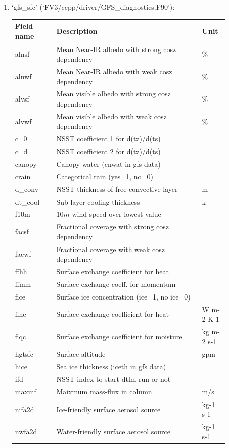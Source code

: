 \documentclass[11pt,fleqn]{report}              %
\begin{document}
\begin{enumerate}
\begin{enumerate}
\item `gfs\_sfc' (`FV3/ccpp/driver/GFS\_diagnostics.F90'):
{
\scriptsize
\begin{longtable}{p{0.17\linewidth} | p{0.6\linewidth} | p{0.11\linewidth} }
\hline
\hline
Field name & Description & Unit \\
\hline
alnsf  & Mean Near-IR albedo with strong cosz dependency & \% \\
alnwf  & Mean Near-IR albedo with weak cosz dependency & \%  \\
alvsf  & Mean visible albedo with strong cosz dependency & \%  \\
alvwf  & Mean visible albedo with weak cosz dependency & \%  \\
c\_0  & NSST coefficient 1 for d(tz)/d(ts) & \\
c\_d  & NSST coefficient 2 for d(tz)/d(ts) & \\
canopy  & Canopy water (cnwat in gfs data) &  \\  
crain & Categorical rain (yes=1, no=0) & \\
d\_conv  & NSST thickness of free convective layer & m  \\
dt\_cool  & Sub-layer cooling thickness  & k \\
f10m  & 10$m$ wind speed over lowest value & \\
facsf & Fractional coverage with strong cosz dependency & \\
facwf & Fractional coverage with weak cosz dependency  & \\
ffhh  & Surface exchange coefficient for heat & \\
ffmm  & Surface exchange coeff. for momentum & \\
fice  & Surface ice concentration (ice=1, no ice=0) & \\
flhc  & Surface exchange coefficient for heat & W m-2 K-1  \\
flqc  & Surface exchange coefficient for moisture & kg m-2 s-1  \\
hgtsfc  & Surface altitude  & gpm \\
hice  & Sea ice thickness (iceth in gfs data) & \\
ifd & NSST index to start dtlm run or not & \\
maxmf  & Maixmum mass-flux in column & m/s \\
nifa2d & Ice-friendly surface aerosol source & kg-1 s-1  \\
nwfa2d  & Water-friendly surface aerosol source & kg-1 s-1  \\

\end{longtable}}
\end{enumerate}
\end{enumerate}
\end{document}
